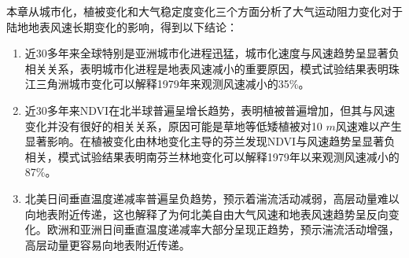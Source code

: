 本章从城市化，植被变化和大气稳定度变化三个方面分析了大气运动阻力变化对于陆地地表风速长期变化的影响，得到以下结论：

\begin{enumerate}

\item 近30多年来全球特别是亚洲城市化进程迅猛，城市化速度与风速趋势呈显著负相关关系，表明城市化进程是地表风速减小的重要原因，模式试验结果表明珠江三角洲城市变化可以解释1979年来观测风速减小的35\%。

\item 近30多年来NDVI在北半球普遍呈增长趋势，表明植被普遍增加，但其与风速变化并没有很好的相关关系，原因可能是草地等低矮植被对10 $m$风速难以产生显著影响。在植被变化由林地变化主导的芬兰发现NDVI与风速趋势呈显著负相关，模式试验结果表明南芬兰林地变化可以解释1979年以来观测风速减小的87\%。

\item 北美日间垂直温度递减率普遍呈负趋势，预示着湍流活动减弱，高层动量难以向地表附近传递，这也解释了为何北美自由大气风速和地表风速趋势呈反向变化。欧洲和亚洲日间垂直温度递减率大部分呈现正趋势，预示湍流活动增强，高层动量更容易向地表附近传递。

\end{enumerate}